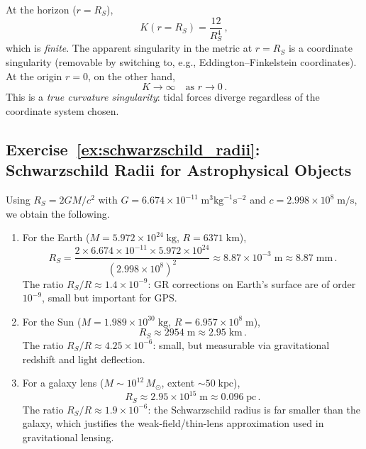 At the horizon ($r = R_S$),
\begin{equation*}
    K(r = R_S) = \frac{12}{R_S^4} \,,
\end{equation*}
which is \emph{finite}.  The apparent singularity in the metric at $r = R_S$ is
a coordinate singularity (removable by switching to, e.g., Eddington--Finkelstein
coordinates).  At the origin $r = 0$, on the other hand,
\begin{equation*}
    K \to \infty \quad \text{as } r \to 0 \,.
\end{equation*}
This is a \emph{true curvature singularity}: tidal forces diverge regardless of
the coordinate system chosen.

\subsection*{Exercise~\ref{ex:schwarzschild_radii}: Schwarzschild Radii for Astrophysical Objects}

Using $R_S = 2GM/c^2$ with $G = 6.674\times 10^{-11}\;\text{m}^3\text{kg}^{-1}\text{s}^{-2}$
and $c = 2.998\times 10^{8}\;\text{m/s}$, we obtain the following.

\begin{enumerate}[label=(\alph*)]
    \item For the Earth ($M = 5.972\times 10^{24}\;\text{kg}$, $R = 6371\;\text{km}$),
    \begin{equation*}
        R_S = \frac{2 \times 6.674\times 10^{-11} \times 5.972\times 10^{24}}
                   {(2.998\times 10^{8})^2}
            \approx 8.87\times 10^{-3}\;\text{m}
            \approx 8.87\;\text{mm} \,.
    \end{equation*}
    The ratio $R_S/R \approx 1.4\times 10^{-9}$: GR corrections on Earth's surface
    are of order $10^{-9}$, small but important for GPS.

    \item For the Sun ($M = 1.989\times 10^{30}\;\text{kg}$, $R = 6.957\times 10^{8}\;\text{m}$),
    \begin{equation*}
        R_S \approx 2954\;\text{m} \approx 2.95\;\text{km} \,.
    \end{equation*}
    The ratio $R_S/R \approx 4.25\times 10^{-6}$: small, but measurable via
    gravitational redshift and light deflection.

    \item For a galaxy lens ($M \sim 10^{12}\, M_\odot$, extent $\sim 50\;\text{kpc}$),
    \begin{equation*}
        R_S \approx 2.95\times 10^{15}\;\text{m} \approx 0.096\;\text{pc} \,.
    \end{equation*}
    The ratio $R_S/R \approx 1.9\times 10^{-6}$: the Schwarzschild radius is
    far smaller than the galaxy, which justifies the weak-field/thin-lens
    approximation used in gravitational lensing.
\end{enumerate}

